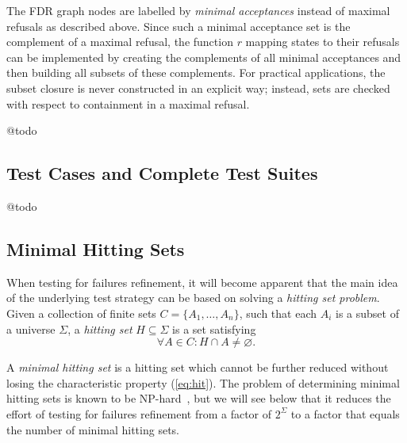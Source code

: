 The FDR graph nodes are labelled by \emph{minimal acceptances} instead of
maximal refusals as described above. Since such a minimal acceptance set is
the complement of a maximal refusal, the function $r$ mapping states to their
refusals can be implemented by creating the complements of all minimal
acceptances and then building all subsets of these complements. For practical
applications, the subset closure is never constructed in an explicit way;
instead, sets are checked with respect to containment in a maximal refusal.

@todo

%



\subsection{Test Cases and Complete Test Suites}
\label{sec:cspcompletedef}

@todo




\subsection{Minimal Hitting Sets}
\label{sec:hit}

When testing for failures refinement, it will become apparent that the main idea of the underlying test strategy can be based on solving a \emph{hitting set problem}. Given a collection of finite sets $C = \{ A_1,\dots,A_n\}$, such that each $A_i$ is a   
subset of a universe $\Sigma$, a \emph{hitting set} $H\subseteq\Sigma$ is a set satisfying
\begin{equation}
\label{eq:hit}
\forall A\in C: H\cap A \neq\varnothing.
\end{equation}

A \emph{minimal hitting set} is a hitting set which cannot be further reduced without losing 
the characteristic property (\ref{eq:hit}). The problem of determining minimal hitting sets is known to be NP-hard~\cite{Book1975-BOOKRM}, but we will see below that it reduces 
the effort of testing for failures refinement from a factor of $2^\Sigma$ to a factor that equals the number of minimal hitting sets.

